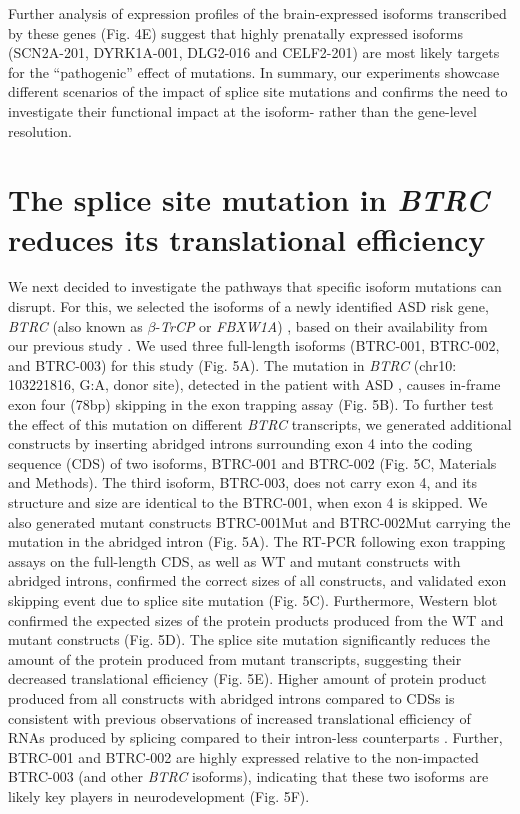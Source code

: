 \documentclass[12pt,chapterheads,final]{ucsd}
\begin{document}
Further analysis of expression profiles of the brain-expressed isoforms transcribed by these genes (Fig. 4E) suggest that highly prenatally expressed isoforms (SCN2A-201, DYRK1A-001, DLG2-016 and CELF2-201) are most likely targets for the “pathogenic” effect of mutations. In summary, our experiments showcase different scenarios of the impact of splice site mutations and confirms the need to investigate their functional impact at the isoform- rather than the gene-level resolution. \par

\section{The splice site mutation in \textit{BTRC} reduces its translational efficiency}
We next decided to investigate the pathways that specific isoform mutations can disrupt. For this, we selected the isoforms of a newly identified ASD risk gene, \textit{BTRC} (also known as $\beta$-\textit{TrCP} or \textit{FBXW1A}) \cite{Ruzzo2019}, based on their availability from our previous study \cite{Yang2016}. We used three full-length isoforms (BTRC-001, BTRC-002, and BTRC-003) for this study (Fig. 5A). The mutation in \textit{BTRC} (chr10: 103221816, G:A, donor site), detected in the patient with ASD \cite{DeRubeis2014}, causes in-frame exon four (78bp) skipping in the exon trapping assay (Fig. 5B). To further test the effect of this mutation on different \textit{BTRC} transcripts, we generated additional constructs by inserting abridged introns surrounding exon 4 into the coding sequence (CDS) of two isoforms, BTRC-001 and BTRC-002 (Fig. 5C, Materials and Methods). The third isoform, BTRC-003, does not carry exon 4, and its structure and size are identical to the BTRC-001, when exon 4 is skipped. We also generated mutant constructs BTRC-001Mut and BTRC-002Mut carrying the mutation in the abridged intron (Fig. 5A). The RT-PCR following exon trapping assays on the full-length CDS, as well as WT and mutant constructs with abridged introns, confirmed the correct sizes of all constructs, and validated exon skipping event due to splice site mutation (Fig. 5C). Furthermore, Western blot confirmed the expected sizes of the protein products produced from the WT and mutant constructs (Fig. 5D). The splice site mutation significantly reduces the amount of the protein produced from mutant transcripts, suggesting their decreased translational efficiency (Fig. 5E). Higher amount of protein product produced from all constructs with abridged introns compared to CDSs is consistent with previous observations of increased translational efficiency of RNAs produced by splicing compared to their intron-less counterparts \cite{Diem2007}. Further, BTRC-001 and BTRC-002 are highly expressed relative to the non-impacted BTRC-003 (and other \textit{BTRC} isoforms), indicating that these two isoforms are likely key players in neurodevelopment (Fig. 5F). \par
\end{document}
